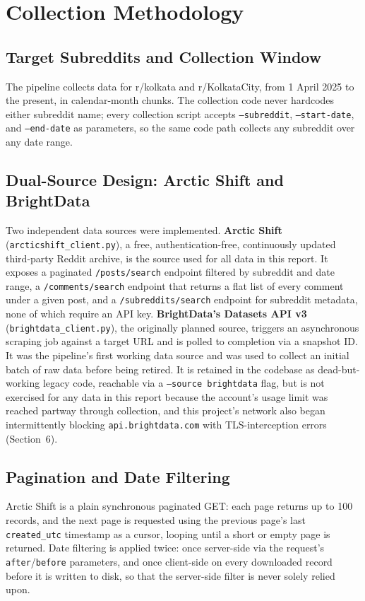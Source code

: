 \documentclass[12pt]{article}
\begin{document}
\section{Collection Methodology}

\subsection{Target Subreddits and Collection Window}
The pipeline collects data for r/kolkata and r/KolkataCity, from 1 April 2025 to the present,
in calendar-month chunks. The collection code never hardcodes either subreddit name; every
collection script accepts \texttt{--subreddit}, \texttt{--start-date}, and \texttt{--end-date}
as parameters, so the same code path collects any subreddit over any date range.

\subsection{Dual-Source Design: Arctic Shift and BrightData}
Two independent data sources were implemented. \textbf{Arctic Shift}
(\texttt{arcticshift\_client.py}), a free, authentication-free, continuously updated third-party
Reddit archive, is the source used for all data in this report. It exposes a paginated
\texttt{/posts/search} endpoint filtered by subreddit and date range, a \texttt{/comments/search}
endpoint that returns a flat list of every comment under a given post, and a
\texttt{/subreddits/search} endpoint for subreddit metadata, none of which require an API key.
\textbf{BrightData's Datasets API v3} (\texttt{brightdata\_client.py}), the originally planned
source, triggers an asynchronous scraping job against a target URL and is polled to completion
via a snapshot ID. It was the pipeline's first working data source and was used to collect an
initial batch of raw data before being retired. It is retained in the codebase as dead-but-working
legacy code, reachable via a \texttt{--source brightdata} flag, but is not exercised for any data
in this report because the account's usage limit was reached partway through collection, and
this project's network also began intermittently blocking \texttt{api.brightdata.com} with
TLS-interception errors (Section~6).

\subsection{Pagination and Date Filtering}
Arctic Shift is a plain synchronous paginated GET: each page returns up to 100 records, and the
next page is requested using the previous page's last \texttt{created\_utc} timestamp as a cursor,
looping until a short or empty page is returned. Date filtering is applied twice: once server-side
via the request's \texttt{after}/\texttt{before} parameters, and once client-side on every
downloaded record before it is written to disk, so that the server-side filter is never solely
relied upon.
\end{document}
